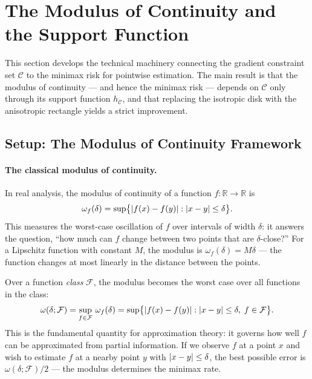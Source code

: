 \section{The Modulus of Continuity and the Support Function}\label{sec:technical_core}

This section develops the technical machinery connecting the gradient constraint set $\mathcal{C}$ to the minimax risk for pointwise estimation.
The main result is that the modulus of continuity --- and hence the minimax risk --- depends on $\mathcal{C}$ only through its support function $h_{\mathcal{C}}$, and that replacing the isotropic disk with the anisotropic rectangle yields a strict improvement.


\subsection{Setup: The Modulus of Continuity Framework}\label{sec:tc:modulus}

\paragraph{The classical modulus of continuity.}
In real analysis, the modulus of continuity of a function $f \colon \mathbb{R} \to \mathbb{R}$ is
\begin{equation}\label{eq:modulus_classical}
	\omega_f(\delta) = \sup\bigl\{ \lvert f(x) - f(y)\rvert : \lvert x - y\rvert \leq \delta \bigr\}.
\end{equation}
This measures the worst-case oscillation of $f$ over intervals of width $\delta$: it answers the question, ``how much can $f$ change between two points that are $\delta$-close?''
For a Lipschitz function with constant $M$, the modulus is $\omega_f(\delta) = M\delta$ --- the function changes at most linearly in the distance between the points.

Over a function \emph{class} $\mathcal{F}$, the modulus becomes the worst case over all functions in the class:
\begin{equation}\label{eq:modulus_class}
	\omega(\delta; \mathcal{F}) = \sup_{f \in \mathcal{F}}\, \omega_f(\delta) = \sup\bigl\{ \lvert f(x) - f(y)\rvert : \lvert x - y\rvert \leq \delta,\; f \in \mathcal{F} \bigr\}.
\end{equation}
This is the fundamental quantity for approximation theory: it governs how well $f$ can be approximated from partial information.
If we observe $f$ at a point $x$ and wish to estimate $f$ at a nearby point $y$ with $\lvert x-y\rvert \leq \delta$, the best possible error is $\omega(\delta; \mathcal{F})/2$ --- the modulus determines the minimax rate.

